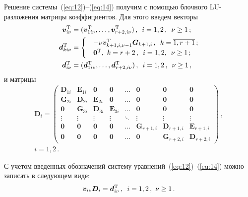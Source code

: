 \begin{multicols}{2}
Решение системы~(\ref{eq:12})--(\ref{eq:14}) получим с помощью блочного 
LU-разложения матрицы коэффициентов. Для этого введем векторы
\begin{align*}
\boldsymbol{v}_{i\nu}^{\mathrm{T}}&=(\boldsymbol{v}_{1i\nu}^{\mathrm{T}},\ldots,
\boldsymbol{v}_{r+2,i\nu}^{\mathrm{T}})\,,\enskip i=1,2\,,\enskip \nu\geq 1\,;
\\
\boldsymbol{d}_{ki\nu}^{\mathrm{T}}&=
\begin{cases}
& -\nu \boldsymbol{v}_{k+1,i,\nu-1}^{\mathrm{T}}\boldsymbol{G}_{k+1,i}\,,\enskip k=\overline{1,r+1}\,;\\
& \boldsymbol{0}^{\mathrm{T}},\,\, k=r+2\,,\enskip i=1,2,\enskip \nu\geq 1\,;
\end{cases}\\
\boldsymbol{d}_{i\nu}^{\mathrm{T}}&=(\boldsymbol{d}_{1i\nu}^{\mathrm{T}},\ldots,
\boldsymbol{d}_{r+2,i\nu}^{\mathrm{T}})\,,\enskip i=1,2\,,\enskip \nu\geq 1\,,
\end{align*}
и матрицы
{\small
\begin{multline*}
\boldsymbol{D}_{i}=
\begin{pmatrix}
\boldsymbol{D}_{1i} &\boldsymbol{E}_{1i} & \boldsymbol{0} &
\boldsymbol{0} & \ldots &\boldsymbol{0} &\boldsymbol{0} &\boldsymbol{0}\\
\boldsymbol{G}_{2i} & \boldsymbol{D}_{2i} & \boldsymbol{E}_{2i} &
\boldsymbol{0} & \ldots & \boldsymbol{0} &\boldsymbol{0} &\boldsymbol{0}\\
\boldsymbol{0} & \boldsymbol{G}_{3i} & \boldsymbol{D}_{3i} &
\boldsymbol{E}_{3i} & \ldots & \boldsymbol{0} & \boldsymbol{0} & \boldsymbol{0}\\
\vdots & \vdots & \vdots & \vdots & \ddots  & \vdots & \vdots & \vdots\\
\boldsymbol{0} & \boldsymbol{0} & \boldsymbol{0} & \boldsymbol{0} & \ldots &
\boldsymbol{G}_{r+1,i} & \boldsymbol{D}_{r+1,i} & \boldsymbol{E}_{r+1,i} \\
\boldsymbol{0} & \boldsymbol{0} & \boldsymbol{0} & \boldsymbol{0} & \ldots & \boldsymbol{0} & \boldsymbol{G}_{r+2,i} & \boldsymbol{D}_{r+2,i}
\end{pmatrix}\,,\\
i=1,2\,.
\end{multline*}}

С учетом введенных обозначений систему уравнений~(\ref{eq:12})--(\ref{eq:14}) можно записать в следующем виде:
\begin{equation}
\label{eq:15}
\boldsymbol{v}_{i\nu}\boldsymbol{D}_{i}=\boldsymbol{d}_{i\nu}^{\mathrm{T}}\,,\enskip i=1,2\,,\,\, \nu \geq 1\,.
\end{equation}


\end{multicols}

